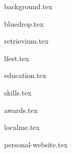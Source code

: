 \documentclass[11pt]{article}
\begin{document}
{background.tex}


{bluedrop.tex}

{retrievium.tex}

{lfest.tex}


{education.tex}


{skills.tex}


{awards.tex}


{localme.tex}

{personal-website.tex}
\end{document}
